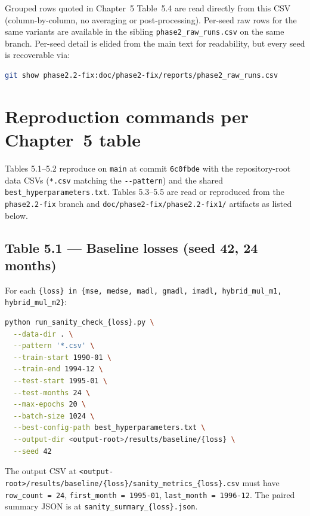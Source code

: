 Grouped rows quoted in Chapter~5 Table~5.4 are read directly from this CSV (column-by-column, no averaging or post-processing). Per-seed raw rows for the same variants are available in the sibling \texttt{phase2\_raw\_runs.csv} on the same branch. Per-seed detail is elided from the main text for readability, but every seed is recoverable via:

\begin{lstlisting}[language=bash]
git show phase2.2-fix:doc/phase2-fix/reports/phase2_raw_runs.csv
\end{lstlisting}

\section{Reproduction commands per Chapter~5 table}

\label{sec:reproduction-commands}

Tables 5.1--5.2 reproduce on \texttt{main} at commit \texttt{6c0fbde} with the repository-root data CSVs (\texttt{*.csv} matching the \texttt{-{}-pattern}) and the shared \texttt{best\_hyperparameters.txt}. Tables 5.3--5.5 are read or reproduced from the \texttt{phase2.2-fix} branch and \texttt{doc/phase2-fix/phase2.2-fix1/} artifacts as listed below.

\subsection{Table 5.1 --- Baseline losses (seed 42, 24 months)}

\label{ssec:table51-baseline-losses}

For each \texttt{\{loss\} in \{mse, medse, madl, gmadl, imadl, hybrid\_mul\_m1, hybrid\_mul\_m2\}}:

\begin{lstlisting}[language=bash]
python run_sanity_check_{loss}.py \
  --data-dir . \
  --pattern '*.csv' \
  --train-start 1990-01 \
  --train-end 1994-12 \
  --test-start 1995-01 \
  --test-months 24 \
  --max-epochs 20 \
  --batch-size 1024 \
  --best-config-path best_hyperparameters.txt \
  --output-dir <output-root>/results/baseline/{loss} \
  --seed 42
\end{lstlisting}

The output CSV at \texttt{<output-root>/results/baseline/\{loss\}/sanity\_metrics\_\{loss\}.csv} must have \texttt{row\_count = 24}, \texttt{first\_month = 1995-01}, \texttt{last\_month = 1996-12}. The paired summary JSON is at \texttt{sanity\_summary\_\{loss\}.json}.

